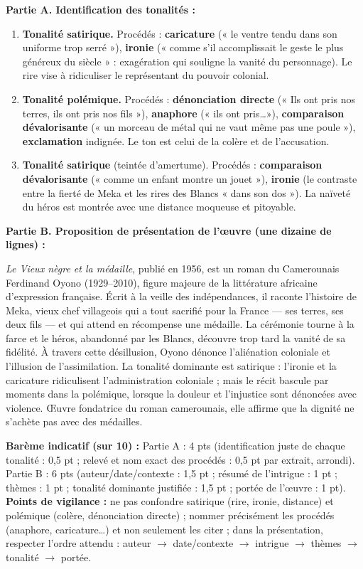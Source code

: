 \documentclass[11pt]{article}
\begin{document}
\begin{corrige}
\textbf{Partie A. Identification des tonalités :}
\begin{enumerate}
\item \textbf{Tonalité satirique.} Procédés : \textbf{caricature} (« le ventre tendu dans son uniforme trop serré »), \textbf{ironie} (« comme s'il accomplissait le geste le plus généreux du siècle » : exagération qui souligne la vanité du personnage). Le rire vise à ridiculiser le représentant du pouvoir colonial.
\item \textbf{Tonalité polémique.} Procédés : \textbf{dénonciation directe} (« Ils ont pris nos terres, ils ont pris nos fils »), \textbf{anaphore} (« ils ont pris\ldots »), \textbf{comparaison dévalorisante} (« un morceau de métal qui ne vaut même pas une poule »), \textbf{exclamation} indignée. Le ton est celui de la colère et de l'accusation.
\item \textbf{Tonalité satirique} (teintée d'amertume). Procédés : \textbf{comparaison dévalorisante} (« comme un enfant montre un jouet »), \textbf{ironie} (le contraste entre la fierté de Meka et les rires des Blancs « dans son dos »). La naïveté du héros est montrée avec une distance moqueuse et pitoyable.
\end{enumerate}
\textbf{Partie B. Proposition de présentation de l'œuvre (une dizaine de lignes) :}

\emph{Le Vieux nègre et la médaille}, publié en 1956, est un roman du Camerounais Ferdinand Oyono (1929--2010), figure majeure de la littérature africaine d'expression française. Écrit à la veille des indépendances, il raconte l'histoire de Meka, vieux chef villageois qui a tout sacrifié pour la France --- ses terres, ses deux fils --- et qui attend en récompense une médaille. La cérémonie tourne à la farce et le héros, abandonné par les Blancs, découvre trop tard la vanité de sa fidélité. À travers cette désillusion, Oyono dénonce l'aliénation coloniale et l'illusion de l'assimilation. La tonalité dominante est satirique : l'ironie et la caricature ridiculisent l'administration coloniale ; mais le récit bascule par moments dans la polémique, lorsque la douleur et l'injustice sont dénoncées avec violence. Œuvre fondatrice du roman camerounais, elle affirme que la dignité ne s'achète pas avec des médailles.

\textbf{Barème indicatif (sur 10) :} Partie A : 4 pts (identification juste de chaque tonalité : 0,5 pt ; relevé et nom exact des procédés : 0,5 pt par extrait, arrondi). Partie B : 6 pts (auteur/date/contexte : 1,5 pt ; résumé de l'intrigue : 1 pt ; thèmes : 1 pt ; tonalité dominante justifiée : 1,5 pt ; portée de l'œuvre : 1 pt).
\textbf{Points de vigilance :} ne pas confondre satirique (rire, ironie, distance) et polémique (colère, dénonciation directe) ; nommer précisément les procédés (anaphore, caricature\ldots) et non seulement les citer ; dans la présentation, respecter l'ordre attendu : auteur $\rightarrow$ date/contexte $\rightarrow$ intrigue $\rightarrow$ thèmes $\rightarrow$ tonalité $\rightarrow$ portée.
\end{corrige}
\end{document}
